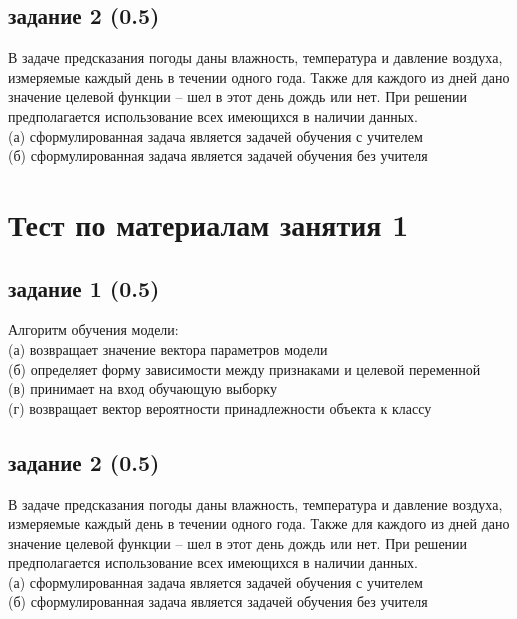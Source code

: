 \documentclass[10pt,a4paper]{article}
\begin{document}
\subsection*{задание 2 (0.5)}

В задаче предсказания погоды даны влажность, температура и давление воздуха, измеряемые каждый день в течении одного года. Также для каждого из дней дано значение целевой функции -- шел в этот день дождь или нет. При решении предполагается использование всех имеющихся в наличии данных. \\
(а) сформулированная задача является задачей обучения с учителем \\
(б) сформулированная задача является задачей обучения без учителя

\vspace{3em}

\section*{Тест по материалам занятия 1}

\subsection*{задание 1 (0.5)}

Алгоритм обучения модели: \\
(а) возвращает значение вектора параметров модели \\
(б) определяет форму зависимости между признаками и целевой переменной \\
(в) принимает на вход обучающую выборку \\
(г) возвращает вектор вероятности принадлежности объекта к классу

\subsection*{задание 2 (0.5)}

В задаче предсказания погоды даны влажность, температура и давление воздуха, измеряемые каждый день в течении одного года. Также для каждого из дней дано значение целевой функции -- шел в этот день дождь или нет. При решении предполагается использование всех имеющихся в наличии данных. \\
(а) сформулированная задача является задачей обучения с учителем \\
(б) сформулированная задача является задачей обучения без учителя
\end{document}
